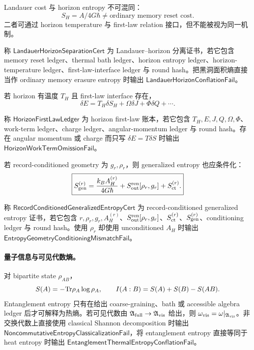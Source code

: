Landauer cost 与 horizon entropy 不可混同：
\[
\boxed{
S_H=A/4G\hbar
\ne
\text{ordinary memory reset cost}.
}
\]
二者可通过 horizon temperature 与 first-law relation 接口，但不能被视为同一机制。

\begin{definition}\label{def:typed-address-biaxial-completion-landauer-horizon-separation-cert}
称 \(\mathsf{LandauerHorizonSeparationCert}\) 为 Landauer--horizon 分离证书，若它包含 memory reset ledger、thermal bath ledger、horizon entropy ledger、horizon-temperature ledger、first-law-interface ledger 与 round hash。把黑洞面积熵直接当作 ordinary memory erasure entropy 时输出 \(\mathsf{LandauerHorizonConflationFail}\)。
\end{definition}

若 horizon 有温度 \(T_H\) 且 first-law interface 存在，
\[
\delta E
=
T_H\delta S_H+\Omega\delta J+\Phi\delta Q+\cdots.
\]

\begin{definition}\label{def:typed-address-biaxial-completion-horizon-first-law-ledger}
称 \(\mathsf{HorizonFirstLawLedger}\) 为 horizon first-law 账本，若它包含 \(T_H,E,J,Q,\Omega,\Phi\)、work-term ledger、charge ledger、angular-momentum ledger 与 round hash。存在 angular momentum 或 charge 而只写 \(\delta E=T\delta S\) 时输出 \(\mathsf{HorizonWorkTermOmissionFail}\)。
\end{definition}

若 record-conditioned geometry 为 \(g_r,\rho_r\)，则 generalized entropy 也应条件化：
\[
\boxed{
S_{\rm gen}^{(r)}
=
\frac{k_BA_H^{(r)}}{4G\hbar}
+S_{\rm out}^{\rm ren}[\rho_r,g_r]
+S_{\rm ct}^{(r)}.
}
\]

\begin{definition}\label{def:typed-address-biaxial-completion-record-conditioned-generalized-entropy-cert}
称 \(\mathsf{RecordConditionedGeneralizedEntropyCert}\) 为 record-conditioned generalized entropy 证书，若它包含 \(r,\rho_r,g_r,A_H^{(r)}\)、\(S_{\rm out}^{\rm ren}[\rho_r,g_r]\)、\(S_{\rm ct}^{(r)}\)、\(S_{\rm gen}^{(r)}\)、conditioning ledger 与 round hash。使用 \(\rho_r\) 却使用 unconditioned \(A_H\) 时输出 \(\mathsf{EntropyGeometryConditioningMismatchFail}\)。
\end{definition}

\paragraph{量子信息与可见代数熵。}
对 bipartite state \(\rho_{AB}\)，
\[
S(A)=-{\rm Tr}\rho_A\log\rho_A,
\qquad
I(A:B)=S(A)+S(B)-S(AB).
\]
Entanglement entropy 只有在给出 coarse-graining、bath 或 accessible algebra ledger 后才可解释为热熵。若可见代数由 \(\mathfrak A_{\rm full}\to\mathfrak A_{\rm vis}\) 给出，则 \(\omega_{\rm vis}=\omega|_{\mathfrak A_{\rm vis}}\)。非交换代数上直接使用 classical Shannon decomposition 时输出 \(\mathsf{NoncommutativeEntropyClassicalizationFail}\)，将 entanglement entropy 直接等同于 heat entropy 时输出 \(\mathsf{EntanglementThermalEntropyConflationFail}\)。

